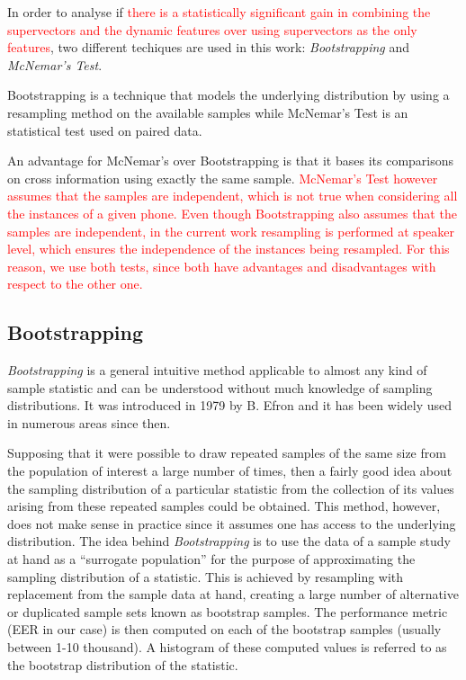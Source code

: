 In order to analyse if %
\textcolor{red}{there is a statistically significant gain in combining the
supervectors and the dynamic features
over using supervectors as the only features},
two different techiques are used in this work: \textit{Bootstrapping} and
\textit{McNemar's Test}.

Bootstrapping is a technique that models the underlying
distribution by using a resampling method on the available samples while McNemar's
Test is an statistical test used on paired data.

An advantage for McNemar's
over Bootstrapping is that it bases its comparisons on cross information using
exactly the same sample. \textcolor{red}{
  McNemar's Test however assumes that the samples
  are independent, which is not true when considering
  all the instances of a given phone. Even though Bootstrapping also assumes that
  the samples are independent, in the current work resampling is performed
  at speaker level, which ensures the independence of the instances being resampled.
  For this reason, we use both tests, since both have advantages and
  disadvantages with respect to the other one.
}

\subsection{Bootstrapping}

\textit{Bootstrapping} \cite{bootstrapping} is a general intuitive method applicable
to almost any kind of sample statistic and can be understood without much
knowledge of sampling distributions. It was introduced in 1979 by B. Efron and it has
been widely used in numerous areas since then.

Supposing that it were possible to draw repeated samples
of the same size from the population of interest a large number of times, then
a fairly good idea about the sampling distribution of a particular statistic from
the collection of its values arising from these repeated samples could be obtained.
This method, however, does not make sense in practice since it assumes one has access to the
underlying distribution.
The idea behind \textit{Bootstrapping} is to use the data of a sample study at hand as a
``surrogate population'' for the purpose of approximating the sampling distribution of
a statistic. This is achieved by resampling with replacement from the sample data
at hand, creating a large number of alternative or duplicated sample sets known as
bootstrap samples. The performance metric (EER in our case)
is then computed on each of the bootstrap
samples (usually between 1-10 thousand). A histogram of these computed
values is referred to as the bootstrap distribution of the statistic.

